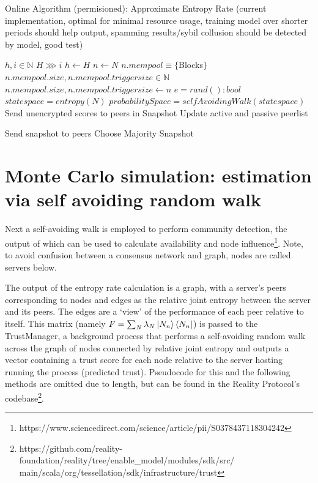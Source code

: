 \documentclass{article}
\begin{document}
\begin{algorithm}
\caption{Online Algorithm (permisioned): Approximate Entropy Rate (current implementation, optimal for minimal resource usage, training model over shorter periods should help output, spamming results/sybil collusion should be detected by model, good test)}\label{alg:cap}
\begin{algorithmic}
\State $h, i \in \mathbb{N}$
\State $H \ggg  i$
\State $h \gets H$
\State $n \gets N$ 
\State $n.mempool \equiv \{ $Blocks$ \}$
\State $n.mempool.size, n.mempool.triggersize \in \mathbb{N}$
\State  $n.mempool.size, n.mempool.triggersize \gets n$ 
\State $e = rand(): bool $ 
		 \State $state space = entropy(N)$ 
   	 	\State $probabilitySpace = selfAvoidingWalk (state space)$  
	 	\State Send unencrypted scores to peers in Snapshot
	 	\State Update active and passive peerlist
		
			\State Send snapshot to peers
			\State Choose Majority Snapshot
	\EndIf
\EndWhile
\end{algorithmic}
\end{algorithm}

\section{Monte Carlo simulation: estimation via self avoiding random walk}
Next a self-avoiding walk is employed to perform community detection, the output of which can be used to calculate availability and node influence\footnote{https://www.sciencedirect.com/science/article/pii/S0378437118304242}. Note, to avoid confusion between a consensus network and graph, nodes are called servers below.

The output of the entropy rate calculation is a graph, with a server’s peers corresponding to nodes and edges as the relative joint entropy between the server and its peers. The edges are a ‘view’ of the performance of each peer relative to itself. This matrix (namely $F = \sum_N \lambda_N \ket{N_n} \bra{N_n}$) is passed to the TrustManager, a background process that performs a self-avoiding random walk across the graph of nodes connected by relative joint entropy and outputs a vector containing a trust score for each node relative to the server hosting running the process (predicted trust). Pseudocode for this and the following methods are omitted due to length, but can be found in the Reality Protocol's codebase\footnote{https://github.com/reality-foundation/reality/tree/enable\_model/modules/sdk/src/\\main/scala/org/tessellation/sdk/infrastructure/trust}.
\end{document}
